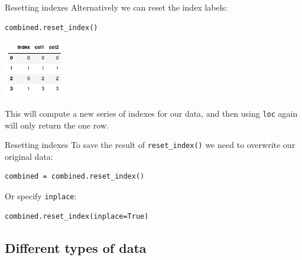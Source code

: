 \documentclass[10pt]{beamer}
\begin{document}
\begin{frame}[label={sec:org82b2dcd},fragile]{Resetting indexes}
 Alternatively we can reset the index labels:

\begin{verbatim}
combined.reset_index()
\end{verbatim}

\begin{center}
\includegraphics[width=0.2\textwidth]{images/reset-index.png}
\end{center}

This will compute a new series of indexes for our data, and then using \texttt{loc} again
will only return the one row.
\end{frame}

\begin{frame}[label={sec:org2f66229},fragile]{Resetting indexes}
 To save the result of \texttt{reset\_index()} we need to overwrite our original data:

\begin{verbatim}
combined = combined.reset_index()
\end{verbatim}

Or specify \texttt{inplace}:

\begin{verbatim}
combined.reset_index(inplace=True)
\end{verbatim}
\end{frame}

\subsection{Different types of data}
\label{sec:org844512b}
\end{document}
